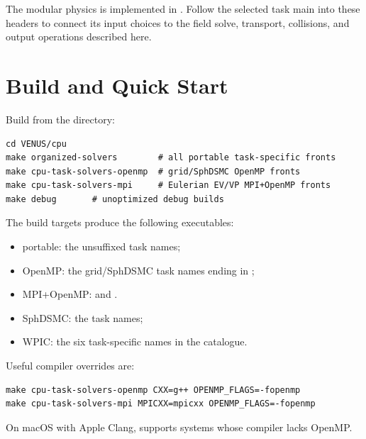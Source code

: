 The modular physics is implemented in . Follow the
selected task main into these headers to connect its input choices to the
field solve, transport, collisions, and output operations described here.

\section{Build and Quick Start}

Build from the  directory:
\begin{lstlisting}
cd VENUS/cpu
make organized-solvers        # all portable task-specific fronts
make cpu-task-solvers-openmp  # grid/SphDSMC OpenMP fronts
make cpu-task-solvers-mpi     # Eulerian EV/VP MPI+OpenMP fronts
make debug       # unoptimized debug builds
\end{lstlisting}
The build targets produce the following executables:
\begin{itemize}
\ifvenusfullcpu
\item portable: the unsuffixed  task names;
\item OpenMP: the grid/SphDSMC task names ending in ;
\item MPI+OpenMP:  and
.
\else
\item SphDSMC: the  task names;
\item WPIC: the six task-specific names in the catalogue.
\fi
\end{itemize}

Useful compiler overrides are:
\begin{lstlisting}
make cpu-task-solvers-openmp CXX=g++ OPENMP_FLAGS=-fopenmp
make cpu-task-solvers-mpi MPICXX=mpicxx OPENMP_FLAGS=-fopenmp
\end{lstlisting}
On macOS with Apple Clang,  supports systems
whose compiler lacks OpenMP.

